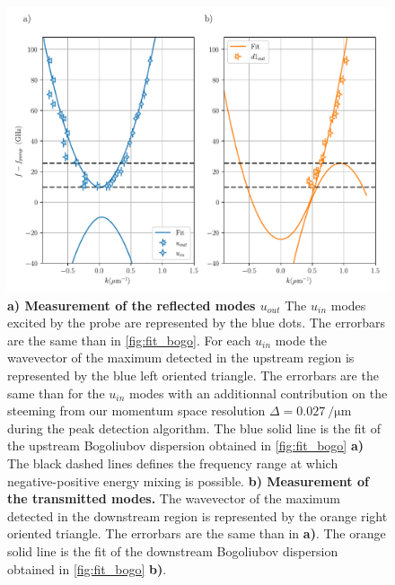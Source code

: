 \begin{figure}
    \centering
    \includegraphics[width=1\textwidth]{chap_stimulated_hawking/fig/fit_bogo_RT.pdf}
    \caption{\textbf{a) Measurement of the reflected modes $u_{out}$} The $u_{in}$ modes excited by the probe are represented by the blue dots. The errorbars are the same than in \autoref{fig:fit_bogo}. For each $u_{in}$ mode
    the wavevector of the maximum detected in the upstream region is represented by the blue left oriented triangle. The errorbars are the same than for the $u_{in}$ modes with an additionnal contribution on the steeming from our momentum space resolution $\Delta=\SI{0.027}{\per \micro \meter}$ during the peak detection algorithm. The blue solid line
    is the fit of the upstream Bogoliubov dispersion obtained in \autoref{fig:fit_bogo} \textbf{a)} The black dashed lines defines the frequency range 
    at which negative-positive energy mixing is possible. 
    \textbf{b) Measurement of the transmitted modes.} The wavevector of the maximum detected in the downstream region is represented by the orange right oriented triangle. The errorbars are the same than in \textbf{a)}. 
    The orange solid line is the fit of the downstream Bogoliubov dispersion obtained in \autoref{fig:fit_bogo} \textbf{b)}. }
    \label{fig:fit_bogo_RT}
\end{figure}

